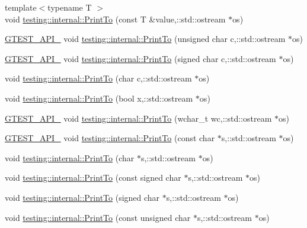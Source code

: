 \begin{DoxyCompactItemize}
\item 
{\footnotesize template$<$typename T $>$ }\\void \hyperlink{namespacetesting_1_1internal_a46859938b459a1581ec760755bc81fc7}{testing\+::internal\+::\+Print\+To} (const T \&value,\+::std\+::ostream $\ast$os)
\item 
\hyperlink{gtest-port_8h_aa73be6f0ba4a7456180a94904ce17790}{G\+T\+E\+S\+T\+\_\+\+A\+P\+I\+\_\+} void \hyperlink{namespacetesting_1_1internal_abae1a8d465376b68576918205ad706a9}{testing\+::internal\+::\+Print\+To} (unsigned char c,\+::std\+::ostream $\ast$os)
\item 
\hyperlink{gtest-port_8h_aa73be6f0ba4a7456180a94904ce17790}{G\+T\+E\+S\+T\+\_\+\+A\+P\+I\+\_\+} void \hyperlink{namespacetesting_1_1internal_a09f551128c4d165c37004e36ccc87aa0}{testing\+::internal\+::\+Print\+To} (signed char c,\+::std\+::ostream $\ast$os)
\item 
void \hyperlink{namespacetesting_1_1internal_ae91b06a9e343f5ddabff85626a7d507a}{testing\+::internal\+::\+Print\+To} (char c,\+::std\+::ostream $\ast$os)
\item 
void \hyperlink{namespacetesting_1_1internal_a832beb8c56070fc5c175b8bfd8bbeba0}{testing\+::internal\+::\+Print\+To} (bool x,\+::std\+::ostream $\ast$os)
\item 
\hyperlink{gtest-port_8h_aa73be6f0ba4a7456180a94904ce17790}{G\+T\+E\+S\+T\+\_\+\+A\+P\+I\+\_\+} void \hyperlink{namespacetesting_1_1internal_a3802453cf4e3f4870f589c69c7b43b2b}{testing\+::internal\+::\+Print\+To} (wchar\+\_\+t wc,\+::std\+::ostream $\ast$os)
\item 
\hyperlink{gtest-port_8h_aa73be6f0ba4a7456180a94904ce17790}{G\+T\+E\+S\+T\+\_\+\+A\+P\+I\+\_\+} void \hyperlink{namespacetesting_1_1internal_afc6dad64c4dd4799036f252c07d8a59f}{testing\+::internal\+::\+Print\+To} (const char $\ast$s,\+::std\+::ostream $\ast$os)
\item 
void \hyperlink{namespacetesting_1_1internal_ae04a499cedbda0b244c216211081a8b6}{testing\+::internal\+::\+Print\+To} (char $\ast$s,\+::std\+::ostream $\ast$os)
\item 
void \hyperlink{namespacetesting_1_1internal_af4616278b2c3ac265ad80481e0ce8da7}{testing\+::internal\+::\+Print\+To} (const signed char $\ast$s,\+::std\+::ostream $\ast$os)
\item 
void \hyperlink{namespacetesting_1_1internal_abac47db29a65b1633028fe8001f57212}{testing\+::internal\+::\+Print\+To} (signed char $\ast$s,\+::std\+::ostream $\ast$os)
\item 
void \hyperlink{namespacetesting_1_1internal_a96409c0b7d8ce520c40a0aa5eb9280b6}{testing\+::internal\+::\+Print\+To} (const unsigned char $\ast$s,\+::std\+::ostream $\ast$os)

\end{DoxyCompactItemize}
